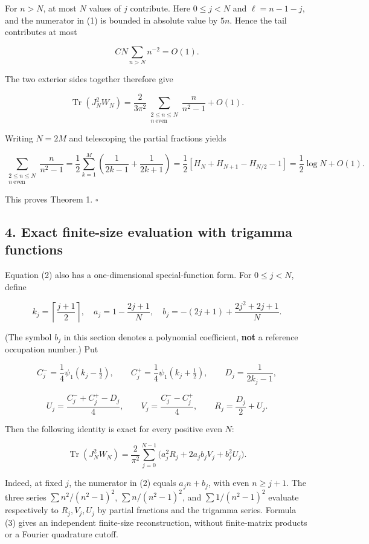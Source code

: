 \documentclass[
  10pt,
  a4paper,
]{article}
\begin{document}
For \(n>N\), at most \(N\) values of \(j\) contribute. Here \(0\le j<N\) and \(\ell=n-1-j\), and the numerator in (1) is bounded in absolute value by \(5n\). Hence the tail contributes at most

\[
 C N\sum_{n>N}n^{-2}=O(1).
\]

The two exterior sides together therefore give

\[
 \operatorname{Tr}(J_N^2W_N)
 =\frac{2}{3\pi^2}\sum_{\substack{2\le n\le N\\ n\ \mathrm{even}}}\frac{n}{n^2-1}+O(1).
\]

Writing \(N=2M\) and telescoping the partial fractions yields

\[
\sum_{\substack{2\le n\le N\\n\ \mathrm{even}}}\frac{n}{n^2-1}
=\frac12\sum_{k=1}^{M}\left(\frac1{2k-1}+\frac1{2k+1}\right)
=\frac12[H_N+H_{N+1}-H_{N/2}-1]
=\frac12\log N+O(1).
\]

This proves Theorem 1. \(\square\)

\subsection{4. Exact finite-size evaluation with trigamma functions}\label{exact-finite-size-evaluation-with-trigamma-functions}

Equation (2) also has a one-dimensional special-function form. For \(0\le j<N\), define

\[
 k_j=\left\lceil\frac{j+1}{2}\right\rceil,\quad
 a_j=1-\frac{2j+1}{N},\quad
 b_j=-(2j+1)+\frac{2j^2+2j+1}{N}.
\]

(The symbol \(b_j\) in this section denotes a polynomial coefficient, \textbf{not} a reference occupation number.) Put

\[
 C_j^- =\frac14\psi_1(k_j-\tfrac12),\qquad
 C_j^+=\frac14\psi_1(k_j+\tfrac12),\qquad
 D_j=\frac1{2k_j-1},
\]

\[
 U_j=\frac{C_j^-+C_j^+-D_j}{4},\qquad
 V_j=\frac{C_j^--C_j^+}{4},\qquad
 R_j=\frac{D_j}{2}+U_j.
\]

Then the following identity is exact for every positive even \(N\):

\[
\boxed{\operatorname{Tr}(J_N^2W_N)=\frac2{\pi^2}
\sum_{j=0}^{N-1}\bigl(a_j^2R_j+2a_jb_jV_j+b_j^2U_j\bigr).}
\tag{3}
\]

Indeed, at fixed \(j\), the numerator in (2) equals \(a_j n+b_j\), with even \(n\ge j+1\). The three series \(\sum n^2/(n^2-1)^2\), \(\sum n/(n^2-1)^2\), and \(\sum 1/(n^2-1)^2\) evaluate respectively to \(R_j,V_j,U_j\) by partial fractions and the trigamma series. Formula (3) gives an independent finite-size reconstruction, without finite-matrix products or a Fourier quadrature cutoff.
\end{document}
